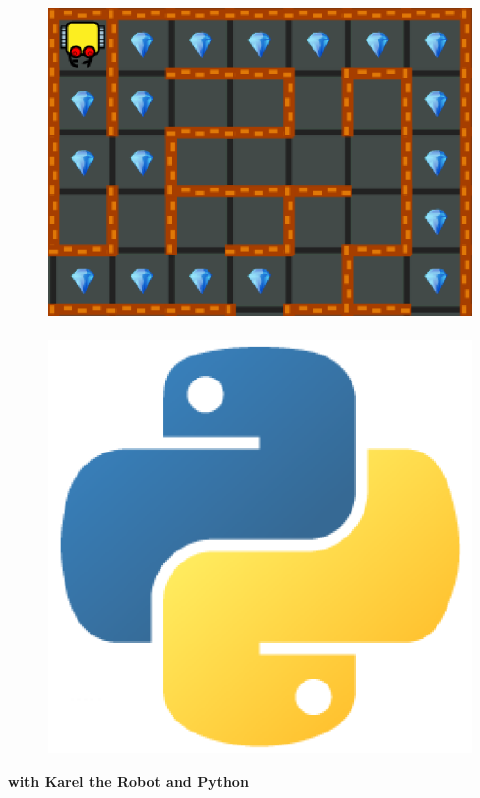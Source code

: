 \documentclass[article,A4,12pt]{llncs}
\begin{document}
\begin{figure}[!ht]
\begin{center}
\vspace{-6mm}
\includegraphics[width=0.26\textheight]{imgk/karel-logo.png}\ \ \ \ \ \ 
\includegraphics[width=0.2\textheight]{imgp/python-logo.png}
\vbox{}
\vspace{-9mm}
\end{center}
\end{figure}
\begin{center}
{\huge \bf with Karel the Robot and Python}
\end{center}
\vbox{}
\vspace{5mm}
\end{document}
